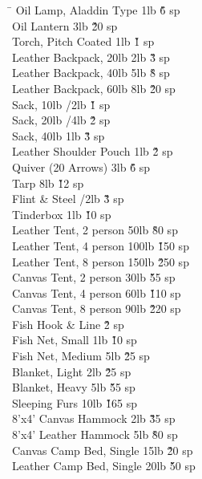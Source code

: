 \begin{multicols}{3}
{\begin{tabbing}
\hspace{0.8\linewidth}\= \kill
Oil Lamp, Aladdin Type			\> 1lb			\' \` 6 sp \\
Oil Lantern				\> 3lb			\' \` 20 sp \\
Torch, Pitch Coated			\> 1lb			\' \` 1 sp \\
Leather Backpack, 20lb			\> 2lb			\' \` 3 sp \\
Leather Backpack, 40lb			\> 5lb			\' \` 8 sp \\
Leather Backpack, 60lb			\> 8lb			\' \` 20 sp \\
Sack, 10lb				/2lb		\' \` 1 sp \\
Sack, 20lb				/4lb		\' \` 2 sp \\
Sack, 40lb				\> 1lb			\' \` 3 sp \\
Leather Shoulder Pouch			\> 1lb			\' \` 2 sp \\
Quiver (20 Arrows)			\> 3lb			\' \` 6 sp \\
Tarp					\> 8lb			\' \` 12 sp \\
Flint \& Steel				/2lb		\' \` 3 sp \\
Tinderbox				\> 1lb			\' \` 10 sp \\
Leather Tent, 2 person			\> 50lb			\' \` 80 sp \\
Leather Tent, 4 person			\> 100lb		\' \` 150 sp \\
Leather Tent, 8 person			\> 150lb		\' \` 250 sp \\
Canvas Tent, 2 person			\> 30lb			\' \` 55 sp \\
Canvas Tent, 4 person			\> 60lb			\' \` 110 sp \\
Canvas Tent, 8 person			\> 90lb			\' \` 220 sp \\
Fish Hook \& Line						\' \` 2 sp \\
Fish Net, Small				\> 1lb			\' \` 10 sp \\
Fish Net, Medium			\> 5lb			\' \` 25 sp \\
Blanket, Light				\> 2lb			\' \` 25 sp \\
Blanket, Heavy				\> 5lb			\' \` 55 sp \\
Sleeping Furs				\> 10lb			\' \` 165 sp \\
8'x4' Canvas Hammock			\> 2lb			\' \` 35 sp \\
8'x4' Leather Hammock			\> 5lb			\' \` 80 sp \\
Canvas Camp Bed, Single			\> 15lb			\' \` 20 sp \\
Leather Camp Bed, Single		\> 20lb			\' \` 50 sp \\

\end{tabbing}}
\end{multicols}
